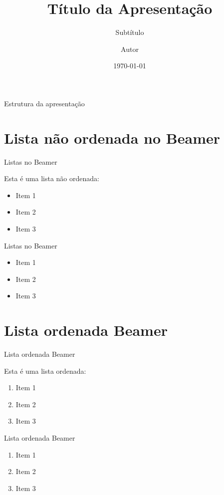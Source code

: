 \documentclass{beamer}        %
\title{Título da Apresentação}  %
\subtitle{Subtítulo} 		%
\author{Autor}			%
\institute{Nome da instituição} %
\date{\today} %
\begin{document}
	
	\begin{frame}
		\titlepage 
	\end{frame}
	
		
	\begin{frame}{Estrutura da apresentação}
		\tableofcontents
	\end{frame}


\section{Lista não ordenada no Beamer} %
\begin{frame}{Listas no Beamer} %
	
	Esta é uma lista não ordenada:
	\begin{itemize}
		\item Item 1
		\item Item 2
		\item Item 3
	\end{itemize}
	
\end{frame}

\begin{frame}{Listas no Beamer}
	
	\begin{itemize}
		\item Item 1
		\item Item 2
		\item Item 3
	\end{itemize}
	
\end{frame}

\section{Lista ordenada Beamer}
\begin{frame}{Lista ordenada Beamer}
	
		Esta é uma lista ordenada:
	\begin{enumerate}
		\item Item 1
		\item Item 2
		\item Item 3
	\end{enumerate}

\end{frame} 

\begin{frame}{Lista ordenada Beamer}
	
	\begin{enumerate}
		\item Item 1
		\item Item 2
		\item Item 3
	\end{enumerate}
	
\end{frame} 
\end{document}
